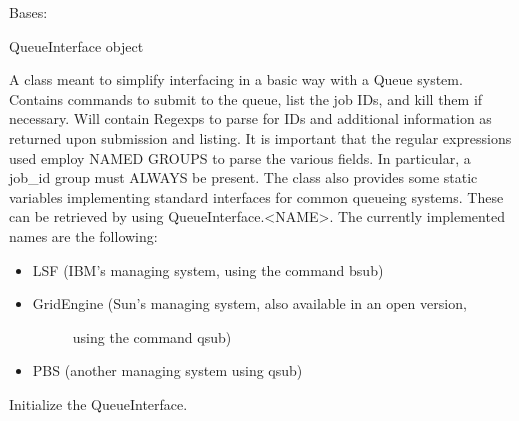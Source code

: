 \documentclass[letterpaper,10pt,english]{sphinxmanual}
\begin{document}
\begin{fulllineitems}
\label{doctree/soprano.hpc.submitter.queues:soprano.hpc.submitter.queues.QueueInterface}
Bases: 

QueueInterface object

A class meant to simplify interfacing in a basic way
with a Queue system. Contains commands to submit to the queue, list the
job IDs, and kill them if necessary. Will contain Regexps to parse for IDs
and additional information as returned upon submission and listing.
It is important that the regular expressions used employ NAMED GROUPS to
parse the various fields. In particular, a job\_id group must ALWAYS be
present.
The class also provides some static variables implementing standard
interfaces for common queueing systems. These can be retrieved by using
QueueInterface.\textless{}NAME\textgreater{}. The currently implemented names are the following:
\begin{itemize}
\item {} 
LSF (IBM's managing system, using the command bsub)

\item {} \begin{description}
\item[{GridEngine (Sun's managing system, also available in an open version,}] \leavevmode
using the command qsub)

\end{description}

\item {} 
PBS (another managing system using qsub)

\end{itemize}

Initialize the QueueInterface.


\end{fulllineitems}
\end{document}
